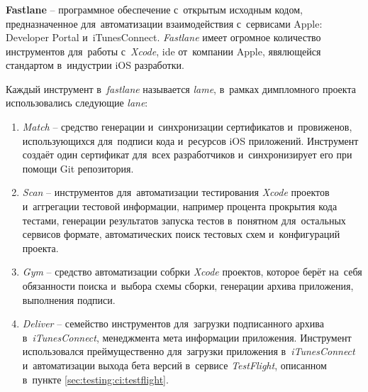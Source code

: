 \subsubsection{}
\label{sec:testing:ci:fastlane}

\textbf{Fastlane} -- программное обеспечение с~открытым исходным кодом, предназначенное для~автоматизации взаимодействия с~сервисами Apple: Developer Portal и~iTunesConnect. \textit{Fastlane} имеет огромное количество инструментов для~работы с~\textit{Xcode}, \gls{ide} от~компании Apple, явялющейся стандартом в~индустрии iOS разработки.

Каждый инструмент в~\textit{fastlane} называется \textit{lame}, в~рамках димпломного проекта использовались следующие \textit{lane}:

\begin{enumerate}
	\item \textit{Match} -- средство генерации и~синхронизации сертификатов и~провиженов, использующихся для~подписи кода и~ресурсов iOS приложений. Инструмент создаёт один сертификат для~всех разработчиков и~синхронизирует его при помощи Git репозитория.
	\item \textit{Scan} -- инструментов для~автоматизации тестирования \textit{Xcode} проектов и~аггрегации тестовой информации, например процента прокрытия кода тестами, генерации результатов запуска тестов в~понятном для~остальных сервисов формате, автоматических поиск тестовых схем и~конфигураций проекта.
	\item \textit{Gym} -- средство автоматизации собрки \textit{Xcode} проектов, которое берёт на~себя обязанности поиска и~выбора схемы сборки, генерации архива приложения, выполнения подписи.
	\item \textit{Deliver} -- семейство инструментов для~загрузки подписанного архива в~\textit{iTunesConnect}, менеджмента мета информации приложения. Инструмент использовался преймущественно для~загрузки приложения в~\textit{iTunesConnect} и~автоматизации выхода бета версий в~сервисе \textit{TestFlight}, описанном в~пункте \ref{sec:testing:ci:testflight}.
\end{enumerate}